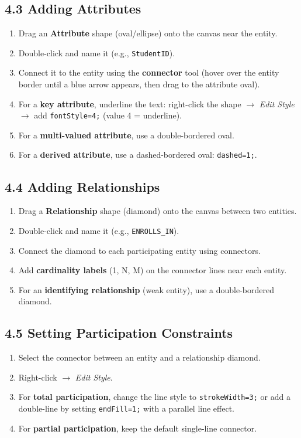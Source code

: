 \documentclass[12pt,a4paper]{article}
\begin{document}
\subsection*{4.3 Adding Attributes}
\begin{enumerate}
    \item Drag an \textbf{Attribute} shape (oval/ellipse) onto the canvas near the entity.
    \item Double-click and name it (e.g., \texttt{StudentID}).
    \item Connect it to the entity using the \textbf{connector} tool (hover over the entity border
          until a blue arrow appears, then drag to the attribute oval).
    \item For a \textbf{key attribute}, underline the text: right-click the shape $\to$ \textit{Edit Style}
          $\to$ add \texttt{fontStyle=4;} (value 4 = underline).
    \item For a \textbf{multi-valued attribute}, use a double-bordered oval.
    \item For a \textbf{derived attribute}, use a dashed-bordered oval: \texttt{dashed=1;}.
\end{enumerate}

\subsection*{4.4 Adding Relationships}
\begin{enumerate}
    \item Drag a \textbf{Relationship} shape (diamond) onto the canvas between two entities.
    \item Double-click and name it (e.g., \texttt{ENROLLS\_IN}).
    \item Connect the diamond to each participating entity using connectors.
    \item Add \textbf{cardinality labels} (1, N, M) on the connector lines near each entity.
    \item For an \textbf{identifying relationship} (weak entity), use a double-bordered diamond.
\end{enumerate}

\subsection*{4.5 Setting Participation Constraints}
\begin{enumerate}
    \item Select the connector between an entity and a relationship diamond.
    \item Right-click $\to$ \textit{Edit Style}.
    \item For \textbf{total participation}, change the line style to \texttt{strokeWidth=3;} or add a
          double-line by setting \texttt{endFill=1;} with a parallel line effect.
    \item For \textbf{partial participation}, keep the default single-line connector.
\end{enumerate}
\end{document}
